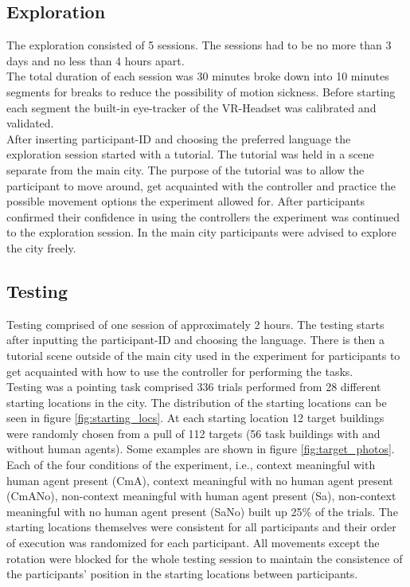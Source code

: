 \subsection{Exploration}

The exploration consisted of 5 sessions. The sessions had to be no more than 3 days and no less than 4 hours apart. \\
The total duration of each session was 30 minutes broke down into 10 minutes segments for breaks to reduce the possibility of motion sickness. Before starting each segment the built-in eye-tracker of the VR-Headset was calibrated and validated. \\

After inserting participant-ID and choosing the preferred language the exploration session started with a tutorial. The tutorial was held in a scene separate from the main city. The purpose of the tutorial was to allow the participant to move around, get acquainted with the controller and practice the possible movement options the experiment allowed for. After participants confirmed their confidence in using the controllers the experiment was continued to the exploration session. In the main city participants were advised to explore the city freely.

\subsection{Testing}

Testing comprised of one session of approximately 2 hours. The testing starts after inputting the participant-ID and choosing the language. There is then a tutorial scene outside of the main city used in the experiment for participants to get acquainted with how to use the controller for performing the tasks. \\

Testing was a pointing task comprised 336 trials performed from 28 different starting locations in the city. The distribution of the starting locations can be seen in figure \ref{fig:starting_locs}. At each starting location 12 target buildings were randomly chosen from a pull of 112 targets (56 task buildings with and without human agents). Some examples are shown in figure \ref{fig:target_photos}. Each of the four conditions of the experiment, i.e., context meaningful with human agent present {\emphasize(CmA)}, context meaningful with no human agent present {\emphasize(CmANo)}, non-context meaningful with human agent present {\emphasize(Sa)}, non-context meaningful with no human agent present {\emphasize(SaNo)} built up 25\% of the trials.  The starting locations themselves were consistent for all participants and their order of execution was randomized for each participant. All movements except the rotation were blocked for the whole testing session to maintain the consistence of the participants' position in the starting locations between participants. \\


